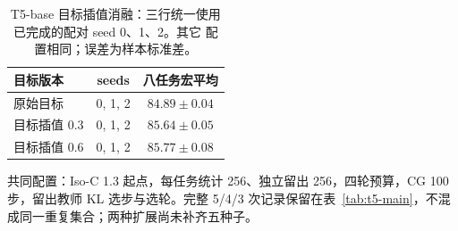 \begin{table}[htbp]
\centering\small
\caption{T5-base 目标插值消融：三行统一使用已完成的配对 seed 0、1、2。其它 \method{} 配置相同；误差为样本标准差。}
\label{tab:t5-target-paired}
\begin{tabular}{@{}lcc@{}}
\toprule
\method{} 目标版本 & seeds & 八任务宏平均 \\
\midrule
原始目标 & 0, 1, 2 & $84.89\pm 0.04$ \\
目标插值 0.3 & 0, 1, 2 & $85.64\pm 0.05$ \\
目标插值 0.6 & 0, 1, 2 & $85.77\pm 0.08$ \\
\bottomrule
\end{tabular}
\par\smallskip
{\footnotesize 共同配置：Iso-C 1.3 起点，每任务统计 256、独立留出 256，四轮预算，CG 100 步，留出教师 KL 选步与选轮。完整 5/4/3 次记录保留在表~\ref{tab:t5-main}，不混成同一重复集合；两种扩展尚未补齐五种子。}
\end{table}
